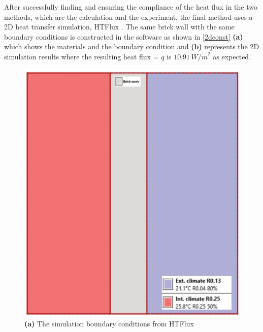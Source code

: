 After successfully finding and ensuring the compliance of the heat flux in the two methods, which are the calculation and the experiment, the final method uses a 2D heat transfer simulation, HTFlux \cite{HTflux}. The same brick wall with the same boundary conditions is constructed in the software as shown in \ref{2dconst} \textbf{(a)} which shows the materials and the boundary condition and \textbf{(b)} represents the 2D simulation results where the resulting heat flux = \( q \) is \( 10.91 \, {W/m}^2 \) as expected.





\begin{figure}[tbh]
\begin{minipage}{0.45\textwidth}
  \centering
  \includegraphics[width=\linewidth]{Figures/2dconst.png} 
  \caption*{\textbf{(a)} The simulation boundary conditions from HTFlux}
\end{minipage}%
\hspace{0.1\textwidth}
\begin{minipage}{0.45\textwidth}
  \centering

\end{minipage}
\end{figure}
